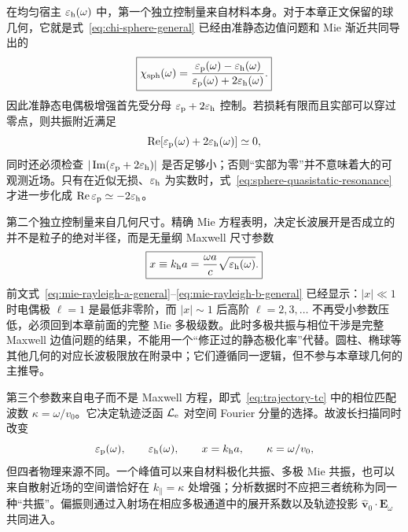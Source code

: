 在均匀宿主 $\varepsilon_{\rm h}(\omega)$ 中，第一个独立控制量来自材料本身。对于本章正文保留的球几何，它就是式~\eqref{eq:chi-sphere-general} 已经由准静态边值问题和 Mie 渐近共同导出的
\begin{equation}
\boxed{
\chi_{\rm sph}(\omega)
=\frac{\varepsilon_{\rm p}(\omega)-\varepsilon_{\rm h}(\omega)}
{\varepsilon_{\rm p}(\omega)+2\varepsilon_{\rm h}(\omega)}.}
\label{eq:material-contrast-factors}
\end{equation}
因此准静态电偶极增强首先受分母
$\varepsilon_{\rm p}+2\varepsilon_{\rm h}$ 控制。若损耗有限而且实部可以穿过零点，则共振附近满足
\begin{equation}
\operatorname{Re}\!\left[\varepsilon_{\rm p}(\omega)+2\varepsilon_{\rm h}(\omega)\right]\simeq0,
\label{eq:sphere-quasistatic-resonance}
\end{equation}
同时还必须检查
$|\operatorname{Im}(\varepsilon_{\rm p}+2\varepsilon_{\rm h})|$
是否足够小；否则“实部为零”并不意味着大的可观测近场。只有在近似无损、$\varepsilon_{\rm h}$ 为实数时，式~\eqref{eq:sphere-quasistatic-resonance} 才进一步化成
$\operatorname{Re}\varepsilon_{\rm p}\simeq-2\varepsilon_{\rm h}$。

第二个独立控制量来自几何尺寸。精确 Mie 方程表明，决定长波展开是否成立的并不是粒子的绝对半径，而是无量纲 Maxwell 尺寸参数
\begin{equation}
\boxed{x\equiv k_{\rm h}a
=\frac{\omega a}{c}\sqrt{\varepsilon_{\rm h}(\omega)}.}
\label{eq:size-parameter-general}
\end{equation}
前文式~\eqref{eq:mie-rayleigh-a-general}--\eqref{eq:mie-rayleigh-b-general} 已经显示：$|x|\ll1$ 时电偶极 $\ell=1$ 是最低非零阶，而 $|x|\sim1$ 后高阶 $\ell=2,3,\ldots$ 不再受小参数压低，必须回到本章前面的完整 Mie 多极级数。此时多极共振与相位干涉是完整 Maxwell 边值问题的结果，不能用一个“修正过的静态极化率”代替。圆柱、椭球等其他几何的对应长波极限放在附录中；它们遵循同一逻辑，但不参与本章球几何的主推导。

第三个参数来自电子而不是 Maxwell 方程，即式~\eqref{eq:trajectory-tc} 中的相位匹配波数 $\kappa=\omega/v_0$。它决定轨迹泛函 $\mathcal L_{\rm e}$ 对空间 Fourier 分量的选择。故波长扫描同时改变
\begin{equation}
\varepsilon_{\rm p}(\omega),\qquad
\varepsilon_{\rm h}(\omega),\qquad
x=k_{\rm h}a,\qquad
\kappa=\omega/v_0,
\end{equation}
但四者物理来源不同。一个峰值可以来自材料极化共振、多极 Mie 共振，也可以来自散射近场的空间谱恰好在 $k_{\parallel}=\kappa$ 处增强；分析数据时不应把三者统称为同一种“共振”。偏振则通过入射场在相应多极通道中的展开系数以及轨迹投影 $\hat{\bm v}_0\cdot\bm E_\omega$ 共同进入。

